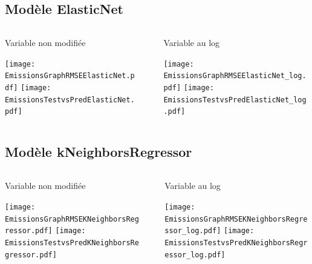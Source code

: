 \documentclass[8pt,aspectratio=169,hyperref={unicode=true}]{beamer}
\begin{document}
\subsection{Modèle ElasticNet}
\begin{frame}[t]{\insertsubsection}
  \begin{columns}
    \begin{column}{.33\textwidth}
      {\centering Variable non modifiée

      }
      \texttt{[image: EmissionsGraphRMSEElasticNet.pdf]}
      \texttt{[image: EmissionsTestvsPredElasticNet.pdf]}
    \end{column}
    \begin{column}{.33\textwidth}

    \end{column}
    \begin{column}{.33\textwidth}
      {\centering Variable au log

      }
      \texttt{[image: EmissionsGraphRMSEElasticNet\_log.pdf]}
      \texttt{[image: EmissionsTestvsPredElasticNet\_log.pdf]}
    \end{column}
  \end{columns}
\end{frame}

\subsection{Modèle kNeighborsRegressor}
\begin{frame}[t]{\insertsubsection}
  \begin{columns}
    \begin{column}{.33\textwidth}
      {\centering Variable non modifiée

      }
      \texttt{[image: EmissionsGraphRMSEKNeighborsRegressor.pdf]}
      \texttt{[image: EmissionsTestvsPredKNeighborsRegressor.pdf]}
    \end{column}
    \begin{column}{.33\textwidth}

    \end{column}
    \begin{column}{.33\textwidth}
      {\centering Variable au log

      }
      \texttt{[image: EmissionsGraphRMSEKNeighborsRegressor\_log.pdf]}
      \texttt{[image: EmissionsTestvsPredKNeighborsRegressor\_log.pdf]}
    \end{column}
  \end{columns}
\end{frame}
\end{document}
